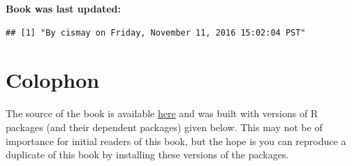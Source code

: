 \documentclass[]{tufte-book}
\begin{document}
\textbf{Book was last updated:}

\begin{verbatim}
## [1] "By cismay on Friday, November 11, 2016 15:02:04 PST"
\end{verbatim}

\section*{Colophon}\label{colophon}

The source of the book is available
\href{https://github.com/ismayc/moderndiver-book}{here} and was built
with versions of R packages (and their dependent packages) given below.
This may not be of importance for initial readers of this book, but the
hope is you can reproduce a duplicate of this book by installing these
versions of the packages.
\end{document}
